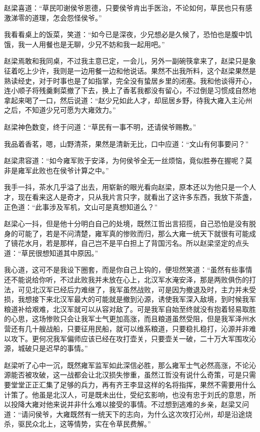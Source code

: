 赵梁喜道：“草民叩谢侯爷恩德，只要侯爷肯出手医治，不论如何，草民也只有感激涕零的道理，怎会怨怪侯爷。”

我看看桌上的饭菜，笑道：“如今已是深夜，少兄想必是久候了，恐怕也是腹中饥饿，我一人用餐也是无聊，少兄不妨和我一起用吧。”

赵梁焉敢和我同桌，不过我主意已定，一会儿，另外一副碗筷拿来了，赵梁只是象征着吃上少许，我则是一边用餐一边和他说话。果然不出我所料，这个赵梁果然是熟读经史，对于时事也是了如指掌，完全没有蛰居乡里的闭塞。我和他谈得开心，连小顺子将残羹剩菜撤了下去，换上了香茗我都没有留心，不过倒是习惯成自然地拿起来喝了一口，然后说道：“赵少兄如此人才，却屈居乡野，待我大雍入主沁州之后，不知道少兄可愿为大雍效力。”

赵梁神色数变，终于问道：“草民有一事不明，还请侯爷赐教。”

我品着香茗，嗯，山野清茶，果然是清新无比，口中应道：“文山有何事要问？”

赵梁肃容道：“如今雍军败于安泽，为何侯爷全无一丝烦恼，竟似胜券在握呢？莫非是雍军此败也在侯爷计算之中。”

我手一抖，茶水几乎溢了出去，用崭新的眼光看向赵梁，原本还以为他只是一个人才，现在看来这人是奇才，只从我片言只字，就看出了这许多东西，我放下茶盏，正色道：“此事涉及军机，文山可是真想知道么？”

赵梁心一抖，但是他十分明白自己的处境，既然江哲出言招揽，自己恐怕是没有脱身的可能了，若是不问清楚，雍军真的惨败而归，那么大雍一统天下就很有可能成了镜花水月，若是那样，自己岂不是平白担上了背国污名。所以赵梁坚定的点头道：“草民很想知道其中原因。”

我心道，这可不是我设下圈套，而是你自己上钩的，便坦然笑道：“虽然有些事情还不能说给你听，不过此败我并未放在心上，北汉军水淹安泽，那是两败俱伤的打法，可见北汉军已经后力难继了，我军虽然战败，可是因为撤退及时，主力并未受损，我想接下来北汉军最大的可能就是撤到沁源，诱使我军深入敌境，到时候我军粮道补给艰难，北汉军就可以从容对敌了。可是我军自始至终就没有抱着轻易取胜的心思，这场惨败只会让我军士气更加高涨，而且粮道虽然受阻，但是我军泽州水营还有几十艘战船，只要征用民船，就可以维系粮道，只要稳扎稳打，沁源并非难以攻下。更何况我军偏师应该已经在攻打壶关，只要壶关一破，二十万大军围攻沁源，城破只是迟早的事情。”

赵梁听了心中一沉，既然雍军监军如此深信必胜，那么雍军士气必然高涨，不论沁源能否被攻破，这一战都会让北汉损失惨重，虽然江哲没有说什么奇策，可是只需要堂堂正正汇集了足够的兵力，再有齐王李显这样的名将指挥，果然不需要用什么计策了。他虽是北汉人，可是既未出仕，受纪玄影响，也没有忠于刘氏的意思，所以投降大雍对他来说并非什么难以接受的事情。不过想到逃难的乡亲，赵梁又问道：“请问侯爷，大雍既然有一统天下的志向，为什么这次攻打沁州，却是沿途烧杀，驱民众北上，这等情势，实在令草民费解。”


